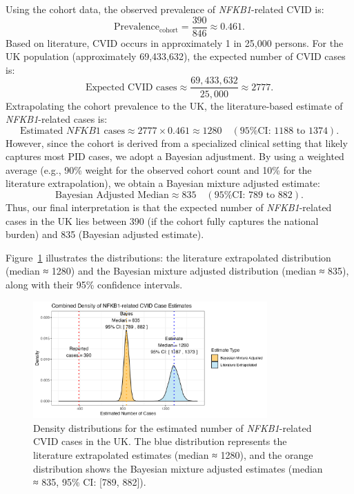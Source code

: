 \documentclass[a4paper,12pt]{article}
\begin{document}
Using the cohort data, the observed prevalence of \textit{NFKB1}-related CVID is:
\[
\text{Prevalence}_{\text{cohort}} = \frac{390}{846} \approx 0.461.
\]
Based on literature, CVID occurs in approximately 1 in 25,000 persons. For the UK population (approximately 69,433,632), the expected number of CVID cases is:
\[
\text{Expected CVID cases} \approx \frac{69,433,632}{25,000} \approx 2777.
\]
Extrapolating the cohort prevalence to the UK, the literature-based estimate of \textit{NFKB1}-related cases is:
\[
\text{Estimated } NFKB1 \text{ cases} \approx 2777 \times 0.461 \approx 1280 \quad (\text{95\% CI: } 1188 \text{ to } 1374).
\]
However, since the cohort is derived from a specialized clinical setting that likely captures most PID cases, we adopt a Bayesian adjustment. By using a weighted average (e.g., 90\% weight for the observed cohort count and 10\% for the literature extrapolation), we obtain a Bayesian mixture adjusted estimate:
\[
\text{Bayesian Adjusted Median} \approx 835 \quad (\text{95\% CI: } 789 \text{ to } 882).
\]
Thus, our final interpretation is that the expected number of \textit{NFKB1}-related cases in the UK lies between 390 (if the cohort fully captures the national burden) and 835 (Bayesian adjusted estimate).

Figure~\ref{fig:nfkb1_case_est_distribution_combined_mixture} illustrates the distributions: the literature extrapolated distribution (median ≈ 1280) and the Bayesian mixture adjusted distribution (median ≈ 835), along with their 95\% confidence intervals.

\begin{figure}[H]
  \centering
  \includegraphics[width=0.8\textwidth]{../images/nfkb1_case_est_distribution_combined_mixture.png}
  \caption{Density distributions for the estimated number of \textit{NFKB1}-related CVID cases in the UK. The blue distribution represents the literature extrapolated estimates (median ≈ 1280), and the orange distribution shows the Bayesian mixture adjusted estimates (median ≈ 835, 95\% CI: [789, 882]).}
  \label{fig:nfkb1_case_est_distribution_combined_mixture}
\end{figure}
\end{document}
